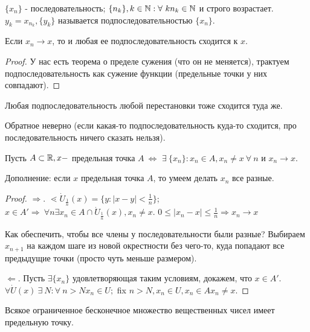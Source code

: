 \documentclass[12pt]{report}
\begin{document}
\begin{defn}
$\{x_n\}$ - последовательность; $\{n_k\}, k \in \mathbb{N}: \forall ~k n_k \in \mathbb{N}$ и строго возрастает. $y_k = x_{n_k}, \{y_k\}$ называется подпоследовательностью $\{x_n\}$.
\end{defn}

\begin{thm}
Если $x_n \to x$, то и любая ее подпоследовательность сходится к $x$.
\end{thm}
\begin{proof}
У нас есть теорема о пределе сужения (что он не меняется), трактуем подпоследовательность как сужение функции (предельные точки у них совпадают).
\end{proof}
\begin{cor}
Любая подпоследовательность любой перестановки тоже сходится туда же.
\end{cor}
\begin{rem}
Обратное неверно (если какая-то подпоследовательность куда-то сходится, про последовательность ничего сказать нельзя).
\end{rem}

\begin{thm}
Пусть $A \subset \mathbb{R}, x - $ предельная точка $A ~\Leftrightarrow$ $\exists ~\{x_n\}: x_n \in A, x_n \neq x ~\forall ~n$ и $x_n \to x$.

Дополнение: если $x$ предельная точка $A$, то умеем делать $x_n$ все разные.
\end{thm}
\begin{proof}
$\Rightarrow$. $\lessdot \dot U_{\frac{1}{n}}(x) = \{y: |x - y| < \frac{1}{n}\}$; $x \in A' \Rightarrow ~\forall n \exists x_n \in A\cap \dot U_{\frac{1}{n}}(x), x_n \neq x$. $0 \le |x_n - x| \le \frac{1}{n} \Rightarrow x_n \to x$

Как обеспечить, чтобы все члены у последовательности были разные? Выбираем $x_{n + 1}$ на каждом шаге из новой окрестности без чего-то, куда попадают все предыдущие точки (просто чуть меньше размером).

$\Leftarrow$. Пусть $\exists \{x_n\}$ удовлетворяющая таким условиям, докажем, что $x \in A'$. $\forall \dot U(x) ~\exists ~N: \forall ~n > N x_n \in U;$ fix $n > N, x_n \in U, x_n \in A x_n \neq x$.
\end{proof}

\begin{rem}
Всякое ограниченное бесконечное множество вещественных чисел имеет предельную точку.
\end{rem}
\end{document}
